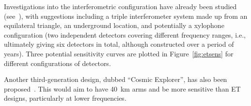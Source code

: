 Investigations into the interferometric configuration have already been studied
(see~\cite{Freise:2008, Hild:2008, Hild:2010}), with suggestions including a
triple interferometer system made up from an equilateral triangle, an
underground location, and potentially a xylophone configuration (two independent
detectors covering different frequency ranges, i.e., ultimately giving six
detectors in total, although constructed over a period of years). Three
potential sensitivity curves are plotted in Figure~\ref{fig:etsens} for different
configurations of detectors.

Another third-generation design, dubbed ``Cosmic Explorer'', has also been proposed~\cite{2016arXiv160708697A}.
This would aim to have 40~km arms and be more sensitive than ET designs, particularly at lower
frequencies.